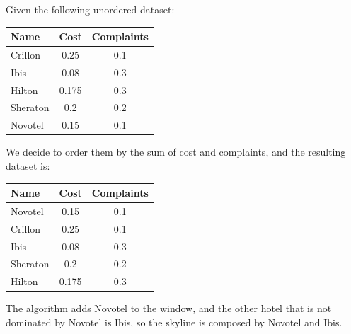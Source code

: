 \documentclass[12pt, a4paper]{report}
\begin{document}
    \begin{example}
        Given the following unordered dataset: 
        \begin{table}[H]
            \centering
            \begin{tabular}{lcc}
            \textbf{Name}                 & \textbf{Cost} & \textbf{Complaints} \\ \hline
            \multicolumn{1}{l|}{Crillon}  & 0.25  & 0.1        \\
            \multicolumn{1}{l|}{Ibis}     & 0.08  & 0.3        \\
            \multicolumn{1}{l|}{Hilton}   & 0.175 & 0.3        \\
            \multicolumn{1}{l|}{Sheraton} & 0.2   & 0.2        \\
            \multicolumn{1}{l|}{Novotel}  & 0.15  & 0.1       
            \end{tabular}
        \end{table}
        We decide to order them by the sum of cost and complaints, and the resulting dataset is: 
        \begin{table}[H]
            \centering
            \begin{tabular}{lcc}
            \textbf{Name}                 & \textbf{Cost} & \textbf{Complaints} \\ \hline
            \multicolumn{1}{l|}{Novotel}  & 0.15          & 0.1                 \\
            \multicolumn{1}{l|}{Crillon}  & 0.25          & 0.1                 \\
            \multicolumn{1}{l|}{Ibis}     & 0.08          & 0.3                 \\
            \multicolumn{1}{l|}{Sheraton} & 0.2           & 0.2                 \\
            \multicolumn{1}{l|}{Hilton}   & 0.175         & 0.3                
            \end{tabular}
        \end{table}
        The algorithm adds Novotel to the window, and the other hotel that is not dominated by Novotel is Ibis, so the skyline is composed by Novotel and Ibis. 
    \end{example}
\end{document}
